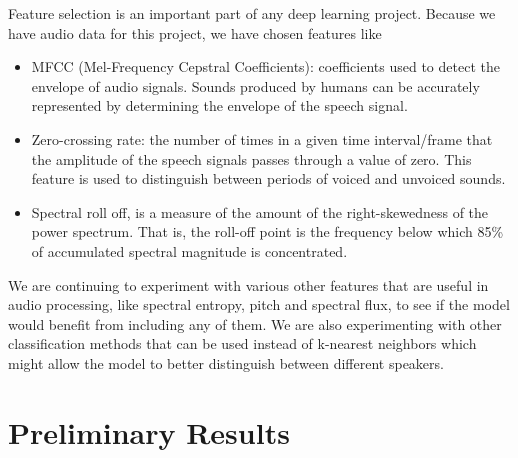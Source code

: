 \documentclass[10pt,twocolumn,letterpaper]{article}
\begin{document}
Feature selection is an important part of any deep learning project. Because we have audio data for this project, we have chosen features like 
\begin{itemize}
    \item MFCC (Mel-Frequency Cepstral Coefficients): coefficients used to detect the envelope of audio signals. Sounds produced by humans can be accurately represented by determining the envelope of the speech signal.
    \item Zero-crossing rate: the number of times in a given time interval/frame that the amplitude of the speech signals passes through a value of zero. This feature is used to distinguish between periods of voiced and unvoiced sounds.
    \item Spectral roll off, is a measure of the amount of the right-skewedness of the power spectrum. That is, the roll-off point is the frequency below which 85\% of accumulated spectral magnitude is concentrated.
\end{itemize}

We are continuing to experiment with various other features that are useful in audio processing, like spectral entropy, pitch and spectral flux, to see if the model would benefit from including any of them. We are also experimenting with other classification methods that can be used instead of k-nearest neighbors which might allow the model to better distinguish between different speakers.


\section{Preliminary Results}





{\small


}
\end{document}
